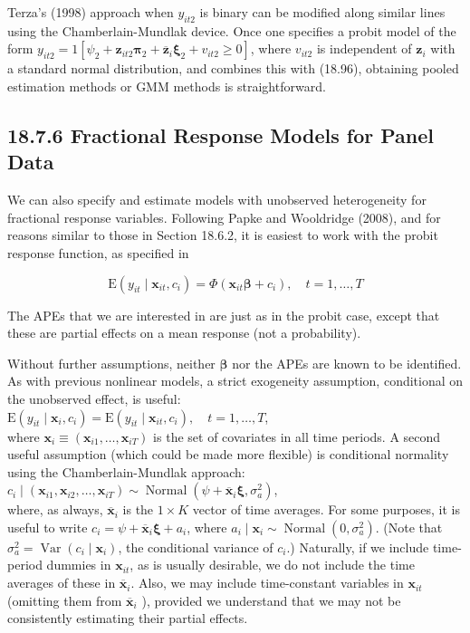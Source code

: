 \documentclass[10pt]{article}
\begin{document}
Terza's (1998) approach when $y_{i t 2}$ is binary can be modified along similar lines using the Chamberlain-Mundlak device. Once one specifies a probit model of the form $y_{i t 2}=1\left[\psi_{2}+\mathbf{z}_{i t 2} \boldsymbol{\pi}_{2}+\overline{\mathbf{z}}_{i} \boldsymbol{\xi}_{2}+v_{i t 2} \geq 0\right]$, where $v_{i t 2}$ is independent of $\mathbf{z}_{i}$ with a standard normal distribution, and combines this with (18.96), obtaining pooled estimation methods or GMM methods is straightforward.

\subsection*{18.7.6 Fractional Response Models for Panel Data}
We can also specify and estimate models with unobserved heterogeneity for fractional response variables. Following Papke and Wooldridge (2008), and for reasons similar to those in Section 18.6.2, it is easiest to work with the probit response function, as specified in


\begin{equation*}
\mathrm{E}\left(y_{i t} \mid \mathbf{x}_{i t}, c_{i}\right)=\Phi\left(\mathbf{x}_{i t} \boldsymbol{\beta}+c_{i}\right), \quad t=1, \ldots, T \tag{18.97}
\end{equation*}


The APEs that we are interested in are just as in the probit case, except that these are partial effects on a mean response (not a probability).

Without further assumptions, neither $\boldsymbol{\beta}$ nor the APEs are known to be identified. As with previous nonlinear models, a strict exogeneity assumption, conditional on the unobserved effect, is useful:\\
$\mathrm{E}\left(y_{i t} \mid \mathbf{x}_{i}, c_{i}\right)=\mathrm{E}\left(y_{i t} \mid \mathbf{x}_{i t}, c_{i}\right), \quad t=1, \ldots, T$,\\
where $\mathbf{x}_{i} \equiv\left(\mathbf{x}_{i 1}, \ldots, \mathbf{x}_{i T}\right)$ is the set of covariates in all time periods. A second useful assumption (which could be made more flexible) is conditional normality using the Chamberlain-Mundlak approach:\\
$c_{i} \mid\left(\mathbf{x}_{i 1}, \mathbf{x}_{i 2}, \ldots, \mathbf{x}_{i T}\right) \sim \operatorname{Normal}\left(\psi+\overline{\mathbf{x}}_{i} \boldsymbol{\xi}, \sigma_{a}^{2}\right)$,\\
where, as always, $\overline{\mathbf{x}}_{i}$ is the $1 \times K$ vector of time averages. For some purposes, it is useful to write $c_{i}=\psi+\overline{\mathbf{x}}_{i} \boldsymbol{\xi}+a_{i}$, where $a_{i} \mid \mathbf{x}_{i} \sim \operatorname{Normal}\left(0, \sigma_{a}^{2}\right)$. (Note that $\sigma_{a}^{2}= \operatorname{Var}\left(c_{i} \mid \mathbf{x}_{i}\right)$, the conditional variance of $c_{i}$.) Naturally, if we include time-period dummies in $\mathbf{x}_{i t}$, as is usually desirable, we do not include the time averages of these in $\overline{\mathbf{x}}_{i}$. Also, we may include time-constant variables in $\mathbf{x}_{i t}$ (omitting them from $\overline{\mathbf{x}}_{i}$ ), provided we understand that we may not be consistently estimating their partial effects.
\end{document}
